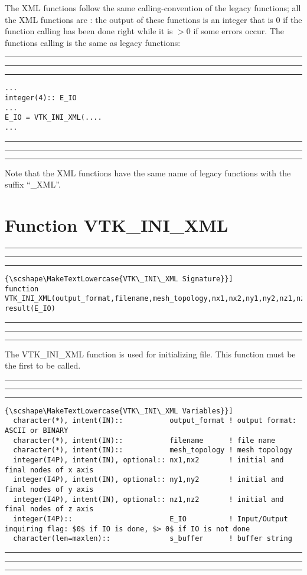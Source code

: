 \documentclass[pagesize=pdftex,fontsize=10pt,paper=a4,oneside]{scrbook}
\DeclareRobustCommand{\MarginNote}[1]{\marginpar{%
\slshape\footnotesize%
\parindent=0pt\lineskip=0pt\lineskiplimit=0pt%
\tolerance=2000\hyphenpenalty=300\exhyphenpenalty=300%
\doublehyphendemerits=100000\finalhyphendemerits=\doublehyphendemerits%
\raggedright\hspace{0pt}#1}}
\newenvironment{boxred}[1]%
               {%
                \noindent\hspace*{-0.025\textwidth}%
                \color{Maroon}%
                \rule[-5.8pt]{0.6pt}{6pt}\hspace*{-0.6pt}\rule{1.05\textwidth}{0.6pt}\hspace*{-0.6pt}\rule[-5.8pt]{0.6pt}{6pt}%
                \color{black}%
                \vspace*{0.6pt}\MarginNote{\color{Maroon}{#1}}%
               }%
               {%
                \noindent\hspace*{-0.025\textwidth}%
                \color{Maroon}%
                \rule[0pt]{0.6pt}{6pt}\hspace*{-0.6pt}\rule{1.05\textwidth}{0.6pt}\hspace*{-0.6pt}\rule[0pt]{0.6pt}{6pt}%
                \color{black}%
                \vspace*{2mm}%
               }
\newcommand{\virgo}[1]{``{#1}''}
\DeclareRobustCommand{\MaiuscolettoBS}[1]{\textls[80]{\scshape\MakeTextLowercase{#1}}}
\begin{document}
The XML functions follow the same calling-convention of the legacy functions; all the \LIBVTKIO XML functions are
\MaiuscolettoBS{4-byte integer function}: the output of these functions is an integer that is $0$ if the function calling
has been done right while it is $> 0$  if some errors occur. The functions calling is the same as legacy functions:

\begin{boxred}{Functions Calling}
\begin{verbatim}
...
integer(4):: E_IO
...
E_IO = VTK_INI_XML(....
...
\end{verbatim}
\end{boxred}

\noindent Note that the XML functions have the same name of legacy functions with the suffix \virgo{\_XML}.

\section{Function VTK\_INI\_XML}
\label{fun:VTK_INI_XML}
 
 
\begin{boxred}{}
\begin{lstlisting}[style=signature,title=\color{Maroon}\MaiuscolettoBS{VTK\_INI\_XML Signature}]
function VTK_INI_XML(output_format,filename,mesh_topology,nx1,nx2,ny1,ny2,nz1,nz2) result(E_IO)
\end{lstlisting}
\end{boxred}
 
The VTK\_INI\_XML function is used for initializing file. This function must be the first to be called.


 
\begin{boxred}{}
\begin{lstlisting}[style=variables,title=\color{Maroon}\MaiuscolettoBS{VTK\_INI\_XML Variables}]
  character(*), intent(IN)::           output_format ! output format: ASCII or BINARY
  character(*), intent(IN)::           filename      ! file name
  character(*), intent(IN)::           mesh_topology ! mesh topology
  integer(I4P), intent(IN), optional:: nx1,nx2       ! initial and final nodes of x axis
  integer(I4P), intent(IN), optional:: ny1,ny2       ! initial and final nodes of y axis
  integer(I4P), intent(IN), optional:: nz1,nz2       ! initial and final nodes of z axis
  integer(I4P)::                       E_IO          ! Input/Output inquiring flag: $0$ if IO is done, $> 0$ if IO is not done
  character(len=maxlen)::              s_buffer      ! buffer string
\end{lstlisting}

\end{boxred}
 
\end{document}
